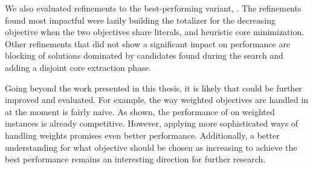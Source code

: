 We also evaluated refinements to the best-performing variant, \msh{}.
The refinements found most impactful were lazily building the totalizer for the decreasing objective when the two objectives share literals, and heuristic core minimization.
Other refinements that did not show a significant impact on performance are blocking of solutions dominated by candidates found during the search and adding a disjoint core extraction phase.

Going beyond the work presented in this thesis, it is likely that \algname{} could be further improved and evaluated.
For example, the way weighted objectives are handled in \algname{} at the moment is fairly naive.
As shown, the performance of \algname{} on weighted instances is already competitive.
However, applying more sophisticated ways of handling weights promises even better performance.
Additionally, a better understanding for what objective should be chosen as increasing to achieve the best performance remains an interesting direction for further research.